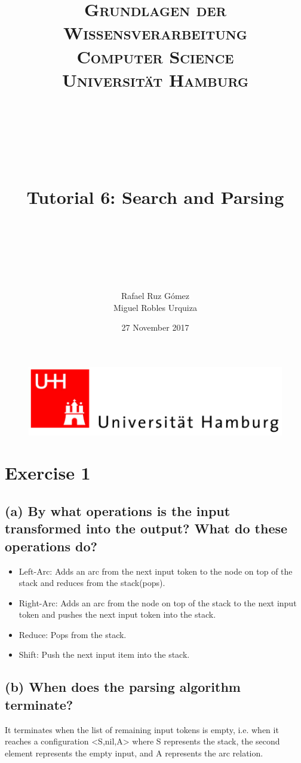 \documentclass[paper=a4, fontsize=11pt]{scrartcl} %
\title{	
\normalfont \normalsize 
\textsc{\textbf{Grundlagen der Wissensverarbeitung} \\ Computer Science \\ Universität Hamburg} \\ [25pt] %
~\\
~\\
~\\
\horrule{0.5pt} \\[0.4cm] %
\Huge Tutorial 6: Search and Parsing \\ %
\horrule{2pt} \\[0.5cm] %
~\\
~\\
}
\author{Rafael Ruz Gómez\\Miguel Robles Urquiza} %
\date{\normalsize 27 November 2017} %
\numberwithin{equation}{section} %
\numberwithin{figure}{section} %
\numberwithin{table}{section} %
\begin{document}
\maketitle %

\begin{figure}
	\centering
	\includegraphics[scale=0.8]{logo_uni_hamburg.png}
\end{figure}

\newpage %





\section*{Exercise 1}

\subsection*{(a) By what operations is the input transformed into the output? What do these operations do?}

\begin{itemize}
	\item Left-Arc: Adds an arc from the next input token to the node on top of the stack and reduces from the stack(pops).
	\item Right-Arc: Adds an arc from the node on top of the stack to the next input token and pushes the next input token into the stack.
	\item Reduce: Pops from the stack.
	\item Shift: Push the next input item into the stack.
\end{itemize}

\subsection*{(b) When does the parsing algorithm terminate?}

It terminates when the list of remaining input tokens is empty, i.e. when it reaches a configuration <S,nil,A> where S represents the stack, the second element represents the empty input, and A represents the arc relation.
\end{document}
